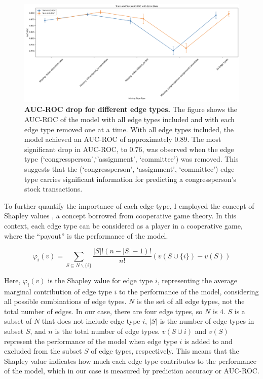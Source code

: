 \documentclass[15pt,letterpaper]{article}
\begin{document}
\begin{figure}[h!]
  \centering
  \includegraphics[width=1.1\textwidth, height=0.4\textheight]{imgs/auc2.png}
  \caption{\textbf{AUC-ROC drop for different edge types.} The figure shows the AUC-ROC of the model with all edge types included and with each edge type removed one at a time. With all edge types included, the model achieved an AUC-ROC of approximately 0.89. The most significant drop in AUC-ROC, to 0.76, was observed when the edge type (`congressperson',`'assignment', `committee') was removed. This suggests that the (`congressperson', `assignment', `committee') edge type carries significant information for predicting a congressperson's stock transactions.}
  \label{fig:auc_roc_drop}
\end{figure}

To further quantify the importance of each edge type, I employed the concept of Shapley values \citep{shapley1,shapley2,shapley3}, a concept borrowed from cooperative game theory. In this context, each edge type can be considered as a player in a cooperative game, where the ``payout'' is the performance of the model.

$$
\varphi_i(v)=\sum_{S \subseteq N \backslash\{i\}} \frac{|S| !(n-|S|-1) !}{n !}(v(S \cup\{i\})-v(S))
$$

Here, $\varphi_i(v)$ is the Shapley value for edge type $i$, representing the average marginal contribution of edge type $i$ to the performance of the model, considering all possible combinations of edge types. $N$ is the set of all edge types, not the total number of edges. In our case, there are four edge types, so $N$ is 4. $S$ is a subset of $N$ that does not include edge type $i$, $|S|$ is the number of edge types in subset $S$, and $n$ is the total number of edge types. $v(S \cup{i})$ and $v(S)$ represent the performance of the model when edge type $i$ is added to and excluded from the subset $S$ of edge types, respectively. This means that the Shapley value indicates how much each edge type contributes to the performance of the model, which in our case is measured by prediction accuracy or AUC-ROC.
\end{document}
